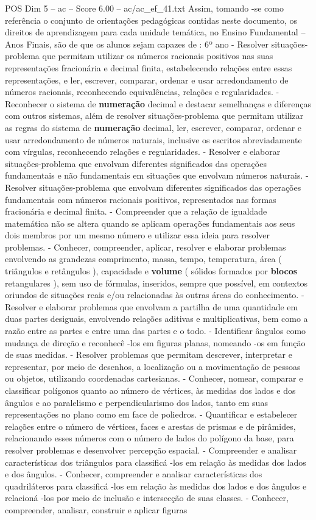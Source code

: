 \begin{textsample}{POS Dim 5 – ac – Score 6.00 – ac/ac\_ef\_41.txt}
Assim, tomando -se como referência o conjunto de orientações pedagógicas contidas neste documento, os direitos de aprendizagem para cada unidade temática, no Ensino Fundamental – Anos Finais, são de que os alunos sejam capazes de : 6º ano - Resolver situações-problema que permitam utilizar os números racionais positivos nas suas representações fracionária e decimal finita, estabelecendo relações entre essas representações, e ler, escrever, comparar, ordenar e usar arredondamento de números racionais, reconhecendo equivalências, relações e regularidades. - Reconhecer o sistema de \textbf{numeração} decimal e destacar semelhanças e diferenças com outros sistemas, além de resolver situações-problema que permitam utilizar as regras do sistema de \textbf{numeração} decimal, ler, escrever, comparar, ordenar e usar arredondamento de números naturais, inclusive os escritos abreviadamente com vírgulas, reconhecendo relações e regularidades. - Resolver e elaborar situações-problema que envolvam diferentes significados das operações fundamentais e não fundamentais em situações que envolvam números naturais. - Resolver situações-problema que envolvam diferentes significados das operações fundamentais com números racionais positivos, representados nas formas fracionária e decimal finita. - Compreender que a relação de igualdade matemática não se altera quando se aplicam operações fundamentais aos seus dois membros por um mesmo número e utilizar essa ideia para resolver problemas. - Conhecer, compreender, aplicar, resolver e elaborar problemas envolvendo as grandezas comprimento, massa, tempo, temperatura, área ( triângulos e retângulos ), capacidade e \textbf{volume} ( sólidos formados por \textbf{blocos} retangulares ), sem uso de fórmulas, inseridos, sempre que possível, em contextos oriundos de situações reais e/ou relacionadas às outras áreas do conhecimento. - Resolver e elaborar problemas que envolvam a partilha de uma quantidade em duas partes desiguais, envolvendo relações aditivas e multiplicativas, bem como a razão entre as partes e entre uma das partes e o todo. - Identificar ângulos como mudança de direção e reconhecê -los em figuras planas, nomeando -os em função de suas medidas. - Resolver problemas que permitam descrever, interpretar e representar, por meio de desenhos, a localização ou a movimentação de pessoas ou objetos, utilizando coordenadas cartesianas. - Conhecer, nomear, comparar e classificar polígonos quanto ao número de vértices, às medidas dos lados e dos ângulos e ao paralelismo e perpendicularismo dos lados, tanto em suas representações no plano como em face de poliedros. - Quantificar e estabelecer relações entre o número de vértices, faces e arestas de prismas e de pirâmides, relacionando esses números com o número de lados do polígono da base, para resolver problemas e desenvolver percepção espacial. - Compreender e analisar características dos triângulos para classificá -los em relação às medidas dos lados e dos ângulos. - Conhecer, compreender e analisar características dos quadriláteros para classificá -los em relação às medidas dos lados e dos ângulos e relacioná -los por meio de inclusão e intersecção de suas classes. - Conhecer, compreender, analisar, construir e aplicar figuras 
\end{textsample}
